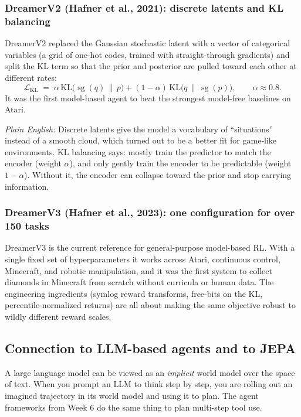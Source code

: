 \documentclass[11pt]{article}
\newcommand{\KL}{\mathrm{KL}}
\theoremstyle{remark}
\newcommand{\plain}[1]{\medskip\noindent\textit{Plain English:} #1\medskip}
\newcommand{\sg}{\operatorname{sg}}
\begin{document}
\subsubsection*{DreamerV2 (Hafner et al., 2021): discrete latents and KL balancing}

DreamerV2 replaced the Gaussian stochastic latent with a vector of categorical variables (a grid of one-hot codes, trained with straight-through gradients) and split the KL term so that the prior and posterior are pulled toward each other at different rates:
\begin{equation}
  \mathcal L_{\KL} \;=\; \alpha\,\KL\!\big(\sg(q)\,\|\,p\big) + (1-\alpha)\,\KL\!\big(q\,\|\,\sg(p)\big), \qquad \alpha \approx 0.8 .
  \label{eq:klbalance}
\end{equation}
It was the first model-based agent to beat the strongest model-free baselines on Atari.

\plain{Discrete latents give the model a vocabulary of ``situations'' instead of a smooth cloud, which turned out to be a better fit for game-like environments. KL balancing says: mostly train the predictor to match the encoder (weight $\alpha$), and only gently train the encoder to be predictable (weight $1-\alpha$). Without it, the encoder can collapse toward the prior and stop carrying information.}

\subsubsection*{DreamerV3 (Hafner et al., 2023): one configuration for over 150 tasks}

DreamerV3 is the current reference for general-purpose model-based RL. With a single fixed set of hyperparameters it works across Atari, continuous control, Minecraft, and robotic manipulation, and it was the first system to collect diamonds in Minecraft from scratch without curricula or human data. The engineering ingredients (symlog reward transforms, free-bits on the KL, percentile-normalized returns) are all about making the same objective robust to wildly different reward scales.

\subsection{Connection to LLM-based agents and to JEPA}

A large language model can be viewed as an \emph{implicit} world model over the space of text. When you prompt an LLM to think step by step, you are rolling out an imagined trajectory in its world model and using it to plan. The agent frameworks from Week 6 do the same thing to plan multi-step tool use.
\end{document}
